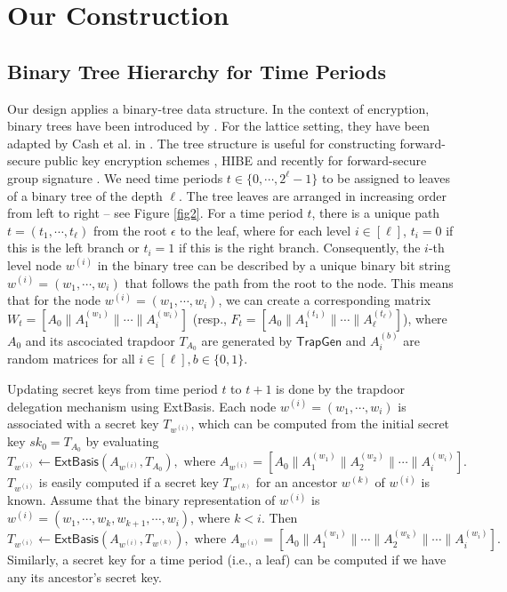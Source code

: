 \documentclass[runningheads]{llncs}
\def\ExtBasis{\mathsf{ExtBasis}}
\begin{document}
\section{Our Construction}
%


\subsection{Binary Tree Hierarchy for Time Periods} \label{binarytree}
Our design applies a binary-tree data structure. In the context of encryption, binary trees have been introduced by \cite{CHK03}.
For the lattice setting, they have been adapted by Cash et al. in  \cite{CHKP10}.
The tree structure is useful for constructing forward-secure public key encryption schemes  \cite{CHK03},
HIBE \cite{CHKP10} and recently for forward-secure group signature \cite{LNWX19}. 
We need time periods $t \in \{0, \cdots, 2^\ell-1 \}$ to be assigned to leaves of a binary tree of the depth $\ell$.
The tree leaves are arranged in increasing order from left to right -- see Figure \ref{fig2}.  
For a time period $t$, there is a unique path $t = (t_1, \cdots, t_\ell)$ from the root $\epsilon$ to the leaf,
where for each level $i\in [\ell]$, $t_i = 0$ if this is the left branch or $t_i = 1$ if this is the right branch.
Consequently, the $i$-th level node $w^{(i)}$ in the binary  tree can be described by
a unique binary bit string $w^{(i)} = (w_1, \cdots, w_i)$ that follows the path from the root to the node. 
This means that for the node $w^{(i)} =( w_1, \cdots, w_i)$, we can create
a corresponding matrix $W_t=[A_0\|A_1^{(w_1)}\| \cdots \|A^{(w_{i})}_{i}]$
(resp., $F_t=[A_0\|A_1^{(t_1)}\| \cdots \|A^{(t_{\ell})}_{\ell}]$), where $A_0$ and its ascociated  trapdoor $ T_{A_0}$ are generated by $\textsf{TrapGen}$ 
and $A_i^{(b)}$ are random matrices for all $i\in [\ell], b\in \{0,1\}$. 

Updating secret keys from time period $t$ to $t+1$ is done 
by the trapdoor delegation mechanism using \textsf{ExtBasis}. 
Each node $w^{(i)}=(w_1,\cdots, w_i)$ is associated with a secret key $T_{w^{(i)}}$, 
which can be computed from the initial secret key $sk_0=T_{A_0}$ by evaluating
\[
T_{w^{(i)}} \leftarrow \ExtBasis( A_{w^{(i)}}, T_{A_0}), \text{ where } A_{w^{(i)}} = \left[ A_0 \|A_1^{(w_1)} \|A_2^{(w_2)}\| \cdots \|A_i^{(w_i)} \right].
\]
$T_{w^{(i)}}$ is easily computed if a secret key $T_{w^{(k)}}$ for an ancestor $w^{(k)}$ of $w^{(i)}$ is known. 
Assume that the binary representation of $w^{(i)}$ is $w^{(i)} =( w_1, \cdots, w_k, w_{k+1}, \cdots, w_i)$,  
where $k<i$. 
Then 
$$T_{w^{(i)}} \leftarrow \ExtBasis( A_{w^{(i)}}, T_{w^{(k)}}), \text{ where } A_{w^{(i)}} = \left[ A_0 \|A_1^{(w_1)}\|\cdots \|A_2^{(w_k)}\| \cdots \|A_i^{(w_i)} \right].$$
Similarly, a secret key for a time period (i.e., a leaf) can be computed if we have any its ancestor's secret key.
\end{document}
